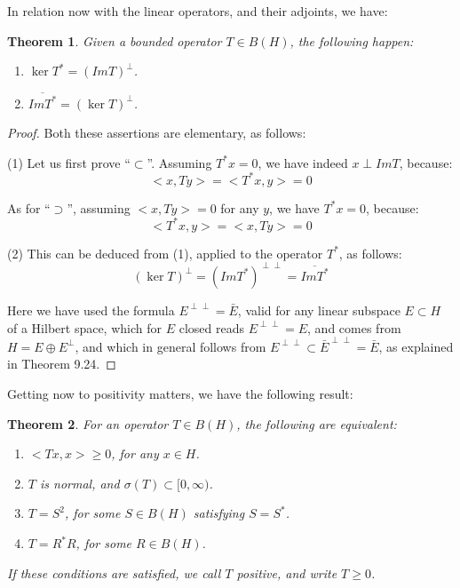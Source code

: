 \documentclass[12pt]{amsbook}
\newtheorem{theorem}{Theorem}[chapter]
\begin{document}
In relation now with the linear operators, and their adjoints, we have:

\begin{theorem}
Given a bounded operator $T\in B(H)$, the following happen:
\begin{enumerate}
\item $\ker T^*=(Im T)^\perp$.

\item $\overline{Im T^*}=(\ker T)^\perp$.
\end{enumerate}
\end{theorem}

\begin{proof}
Both these assertions are elementary, as follows:

\medskip

(1) Let us first prove ``$\subset$''. Assuming $T^*x=0$, we have indeed $x\perp ImT$, because:
$$<x,Ty>
=<T^*x,y>
=0$$

As for ``$\supset$'', assuming $<x,Ty>=0$ for any $y$, we have $T^*x=0$, because:
$$<T^*x,y>
=<x,Ty>
=0$$

(2) This can be deduced from (1), applied to the operator $T^*$, as follows:
$$(\ker T)^\perp
=(Im T^*)^{\perp\perp}
=\overline{Im T^*}$$

Here we have used the formula $E^{\perp\perp}=\bar{E}$, valid for any linear subspace $E\subset H$ of a Hilbert space, which for $E$ closed reads $E^{\perp\perp}=E$, and comes from $H=E\oplus E^\perp$, and which in general follows from $E^{\perp\perp}\subset\bar{E}^{\perp\perp}=\bar{E}$, as explained in Theorem 9.24.
\end{proof}

Getting now to positivity matters, we have the following result:

\begin{theorem}
For an operator $T\in B(H)$, the following are equivalent:
\begin{enumerate}
\item $<Tx,x>\geq0$, for any $x\in H$.

\item $T$ is normal, and $\sigma(T)\subset[0,\infty)$.

\item $T=S^2$, for some $S\in B(H)$ satisfying $S=S^*$.

\item $T=R^*R$, for some $R\in B(H)$.
\end{enumerate}
If these conditions are satisfied, we call $T$ positive, and write $T\geq0$.
\end{theorem}
\end{document}
